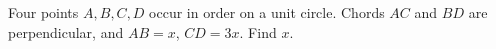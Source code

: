 Four points $A,B,C,D$ occur in order on a unit circle. Chords $AC$ and $BD$ are perpendicular, and $AB=x$, $CD=3x$. Find $x$.
